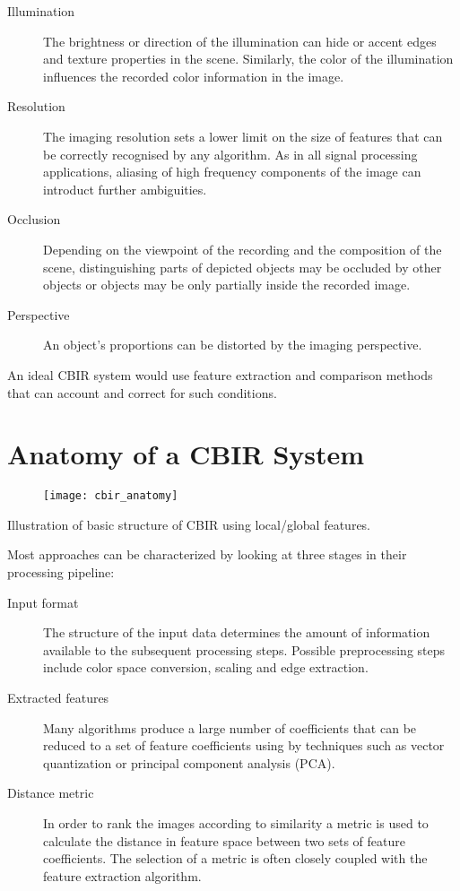 \begin{description}
    \item[Illumination] The brightness or direction of the illumination can
        hide or accent edges and texture properties in the scene. Similarly,
        the color of the illumination influences the recorded color information
        in the image.
    \item[Resolution] The imaging resolution sets a lower limit on the size of
        features that can be correctly recognised by any algorithm. As in all
        signal processing applications, aliasing of high frequency components
        of the image can introduct further ambiguities.
        \autocite{shannon_communication_1998}
    \item[Occlusion] Depending on the viewpoint of the recording and the
        composition of the scene, distinguishing parts of depicted objects may
        be occluded by other objects or objects may be only partially inside
        the recorded image.
    \item[Perspective] An object's proportions can be distorted by the imaging
        perspective.
\end{description}

An ideal CBIR system would use feature extraction and comparison methods that
can account and correct for such conditions.

\section{Anatomy of a CBIR System}
\begin{figure}[h]
    \texttt{[image: cbir\_anatomy]}
\end{figure}
Illustration of basic structure of CBIR using local/global features.

Most approaches can be characterized by looking at three stages in their processing pipeline:

\begin{description}
    \item[Input format] The structure of the input data determines the amount of information available to the subsequent processing steps. Possible preprocessing steps include color space conversion, scaling and edge extraction.
    \item[Extracted features] Many algorithms produce a large number of coefficients that can be reduced to a set of feature coefficients using by techniques such as vector quantization or principal component analysis (PCA).
    \item[Distance metric] In order to rank the images according to similarity a metric is used to calculate the distance in feature space between two sets of feature coefficients. The selection of a metric is often closely coupled with the feature extraction algorithm.
\end{description}

